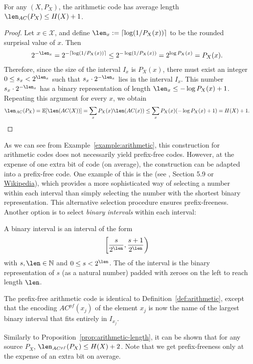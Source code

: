 \begin{proposition}\label{prop:arithmetic-length}
For any $(X,P_X)$, the arithmetic code has average length $\len_{AC}(P_X) \leq H(X) + 1$.
\end{proposition}
\begin{proof}
Let $x \in \mathcal{X}$, and define $\len_x := \lceil \log (1/P_X(x))\rceil$ to be the rounded surprisal value of $x$. Then
\begin{align}
2^{-\len_x} = 2^{-\lceil \log (1/P_X(x))\rceil} \leq 2^{-\log (1/P_X(x))} = 2^{\log P_X(x)} = P_X(x).
\end{align}
Therefore, since the size of the interval $I_x$ is $P_X(x)$, there must exist an integer $0 \leq s_x < 2^{\len_x}$ such that $s_x \cdot 2^{-\len_x}$ lies in the interval $I_x$. This number $s_x \cdot 2^{-\len_x}$ has a binary representation of length $\len_x \leq -\log P_X(x) + 1$. Repeating this argument for every $x$, we obtain
\begin{align}
\len_{AC}(P_X) = \mathbb{E}[\len(AC(X))] = \sum_x P_X(x) \len(AC(x)) \leq \sum_x P_X(x) (-\log P_X(x) + 1) = H(X) + 1.
\end{align}
\end{proof}

As we can see from Example~\ref{example:arithmetic}, this construction for arithmetic codes does not necessarily yield prefix-free codes. However, at the expense of one extra bit of code (on average), the construction can be adapted into a prefix-free code. One example of this is the  (see \CT, Section 5.9 or \href{https://en.wikipedia.org/wiki/Shannon%E2%80%93Fano%E2%80%93Elias_coding}{Wikipedia}), which provides a more sophisticated way of selecting a number within each interval than simply selecting the number with the shortest binary representation. This alternative selection procedure ensures prefix-freeness. Another option is to select \emph{binary intervals} within each interval:

\begin{definition}
A binary interval is an interval of the form
\[
\left[\frac{s}{2^{\len}}, \frac{s+1}{2^{\len}}\right)
\]
with $s, \len \in \mathbb{N}$ and $0 \leq s < 2^{\len}$. The  of the interval is the binary representation of $s$ (as a natural number) padded with zeroes on the left to reach length $\len$.
\end{definition}

\begin{definition}
The prefix-free arithmetic code is identical to Definition~\ref{def:arithmetic}, except that the encoding $AC^{pf}(x_j)$ of the element $x_j$ is now the name of the largest binary interval that fits entirely in $I_{x_j}$.
\end{definition}
Similarly to Proposition~\ref{prop:arithmetic-length}, it can be shown that for any source  $P_X$, $\len_{AC^{pf}}(P_X) \leq H(X) + 2$. Note that we get prefix-freeness only at the expense of an extra bit on average.

